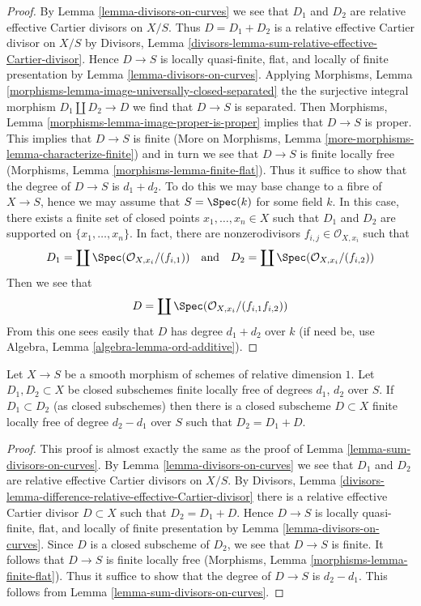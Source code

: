 \begin{proof}
By Lemma \ref{lemma-divisors-on-curves} we see that $D_1$
and $D_2$ are relative effective Cartier divisors on $X/S$.
Thus $D = D_1 + D_2$ is a relative effective Cartier divisor
on $X/S$ by
Divisors, Lemma \ref{divisors-lemma-sum-relative-effective-Cartier-divisor}.
Hence $D \to S$ is locally quasi-finite, flat, and
locally of finite presentation by
Lemma \ref{lemma-divisors-on-curves}.
Applying
Morphisms, Lemma \ref{morphisms-lemma-image-universally-closed-separated}
the the surjective integral morphism $D_1 \amalg D_2 \to D$
we find that $D \to S$ is separated. Then
Morphisms, Lemma \ref{morphisms-lemma-image-proper-is-proper}
implies that $D \to S$ is proper.
This implies that $D \to S$ is finite
(More on Morphisms, Lemma \ref{more-morphisms-lemma-characterize-finite})
and in turn we see that $D \to S$ is finite locally free
(Morphisms, Lemma \ref{morphisms-lemma-finite-flat}).
Thus it suffice to show that the degree of $D \to S$ is $d_1 + d_2$.
To do this we may base change to a fibre of $X \to S$, hence we may
assume that $S = \Spec(k)$ for some field $k$.
In this case, there exists a finite set of closed points
$x_1, \ldots, x_n \in X$ such that $D_1$ and $D_2$
are supported on $\{x_1, \ldots, x_n\}$.
In fact, there are nonzerodivisors $f_{i, j} \in \mathcal{O}_{X, x_i}$
such that
$$
D_1 = \coprod \Spec(\mathcal{O}_{X, x_i}/(f_{i, 1}))
\quad\text{and}\quad
D_2 = \coprod \Spec(\mathcal{O}_{X, x_i}/(f_{i, 2}))
$$
Then we see that
$$
D = \coprod \Spec(\mathcal{O}_{X, x_i}/(f_{i, 1}f_{i, 2}))
$$
From this one sees easily that $D$ has degree $d_1 + d_2$
over $k$ (if need be, use Algebra, Lemma \ref{algebra-lemma-ord-additive}).
\end{proof}

\begin{lemma}
\label{lemma-difference-divisors-on-curves}
Let $X \to S$ be a smooth morphism of schemes of relative dimension $1$.
Let $D_1, D_2 \subset X$ be closed subschemes finite locally free of
degrees $d_1$, $d_2$ over $S$. If $D_1 \subset D_2$ (as closed subschemes)
then there is a closed subscheme $D \subset X$ finite locally free of
degree $d_2 - d_1$ over $S$ such that $D_2 = D_1 + D$.
\end{lemma}

\begin{proof}
This proof is almost exactly the same as the proof of
Lemma \ref{lemma-sum-divisors-on-curves}.
By Lemma \ref{lemma-divisors-on-curves} we see that $D_1$
and $D_2$ are relative effective Cartier divisors on $X/S$.
By Divisors, Lemma
\ref{divisors-lemma-difference-relative-effective-Cartier-divisor}
there is a relative effective Cartier divisor $D \subset X$
such that $D_2 = D_1 + D$. Hence $D \to S$ is locally quasi-finite, flat, and
locally of finite presentation by
Lemma \ref{lemma-divisors-on-curves}.
Since $D$ is a closed subscheme of $D_2$, we see that
$D \to S$ is finite. It follows that $D \to S$ is finite locally free
(Morphisms, Lemma \ref{morphisms-lemma-finite-flat}).
Thus it suffice to show that the degree of $D \to S$ is $d_2 - d_1$.
This follows from Lemma \ref{lemma-sum-divisors-on-curves}.
\end{proof}

